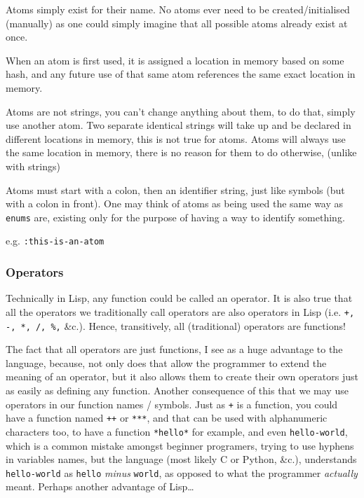 \documentclass{article}
\newcommand{\code}[1]{\texttt{#1}}
\newcommand{\etc}{{\&}c.}
\begin{document}
      Atoms simply exist for their name.
      No atoms ever need to be created/initialised (manually) as
      one could simply imagine that all
      possible atoms already exist at once.

      When an atom is first used, it is assigned
      a location in memory based on some hash, and
      any future use of that same atom
      references the same exact location in memory.

      Atoms are not strings, you can't change anything
      about them, to do that, simply use another atom.
      Two separate identical strings will take up and be
      declared in different locations in memory, this is
      not true for atoms. Atoms will always use the same
      location in memory, there is no reason for them to
      do otherwise, (unlike with strings)

      Atoms must start with a colon, then an identifier
      string, just like symbols (but with a colon in front).
      One may think of atoms as being used the same way
      as \code{enums} are, existing only for the purpose of
      having a way to identify something.\\

      \centerline{e.g. \code{:this-is-an-atom}}

    \subsubsection{Operators}
      Technically in Lisp, any function could be called an operator.
      It is also true that all the operators we traditionally call operators
      are also operators in Lisp (i.e. \code{+, -, *, /, \%,} \etc).
      Hence, transitively, all (traditional) operators are functions!

      The fact that all operators are just functions, I see as a huge advantage
      to the language, because, not only does that allow the programmer to
      extend the meaning of an operator, but it also allows them to create their
      own operators just as easily as defining any function. Another consequence
      of this that we may use operators in our function names / symbols.
      Just as \code{+} is a function, you could have a function named \code{++}
      or \code{***}, and that can be used with alphanumeric characters too, to
      have a function \code{*hello*} for example, and even \code{hello-world},
      which is a common mistake amongst beginner programers, trying to use hyphens
      in variables names, but the language (most likely C or Python, \etc),
      understands \code{hello-world} as \code{hello} \emph{minus} \code{world},
      as opposed to what the programmer \emph{actually} meant. Perhaps another
      advantage of Lisp\ldots
\end{document}
